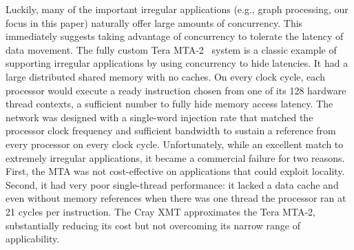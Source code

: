 Luckily, many of the important irregular applications (e.g., graph
processing, our focus in this paper) naturally offer large amounts of
concurrency. This immediately suggests taking advantage of concurrency
to tolerate the latency of data movement. The fully custom Tera
MTA-2~\cite{tera:mta1} system is a classic example of supporting irregular
applications by using concurrency to hide latencies. It had a large
distributed shared memory with no caches.  On every clock cycle, each
processor would execute a ready instruction chosen from one of its 128
hardware thread contexts, a sufficient number to fully hide memory
access latency.  The network was designed with a single-word injection
rate that matched the processor clock frequency and sufficient bandwidth
to sustain a reference from every processor on every clock cycle.
Unfortunately, while an excellent match to extremely irregular
applications, it became a commercial failure for two reasons. First, the MTA was not cost-effective on applications that could
exploit locality. Second, it had very poor single-thread performance: it lacked a data cache and even without memory references when
there was one thread the processor ran at 21 cycles per instruction.
The Cray XMT approximates the Tera MTA-2, substantially reducing its cost but not overcoming its narrow range of
applicability.


% 
% 
% 

